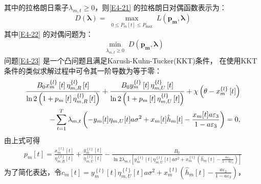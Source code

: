 其中的拉格朗日乘子$\lambda_{m,t}\geq 0$，则\eqref{E4-21} 的拉格朗日对偶函数表示为：
\begin{equation} \label{E4-22}
D(\mathbf{\lambda})=\max _{\substack{0 \leq P_m[t] \leq P_{\max }}} L\left(\mathbf{p_m},\mathbf{\lambda}\right)
\end{equation}
其中\eqref{E4-22} 的对偶问题为：
\begin{equation} \label{E4-23}
\min_{\substack{\lambda_{m,t}\geq 0}} D\left(\mathbf{p_m},\mathbf{\lambda}\right)
\end{equation}
问题\eqref{E4-23} 是一个凸问题且满足Karush-Kuhn-Tucker(KKT)条件，
在使用KKT条件的类似求解过程中可令其一阶导数为等于零：
\begin{align}\label{E4-24}
\frac{{{B}_{0}}x_{m}^{\left\{ l \right\}}\left[ t \right]\eta _{m,R}^{\left\{ l \right\}}\left[ t \right]}{\ln 2\left( 1+{{p}_{m}}\left[ t \right]\eta _{m,R}^{\left\{ l \right\}}\left[ t \right] \right)}+\frac{{{B}_{0}}y_{m}^{\left\{ l \right\}}\left[ t \right]\eta _{m,U}^{\left\{ l \right\}}\left[ t \right]}{\ln 2\left( 1+{{p}_{m}}\left[ t \right]\eta _{m,U}^{\left\{ l \right\}}\left[ t \right] \right)}+\chi \left( \theta -x_{m}^{\left\{ l \right\}}\left[ t \right] \right) \\   \notag
-\sum\limits_{t=1}^{T}{{{\lambda }_{m,t}}}\left( -{{y}_{m}}[t]{{\eta }_{m,U}}[t]a{{\sigma }^{2}}+{{x}_{m}}[t]{{{\hat{h}}}\phantom{}_{m}}[t]-\frac{{{x}_{m}}[t]a{{\varepsilon }_{3}}}{1-a{{\varepsilon }_{3}}} \right)=0,
\end{align}
由上式可得
\begin{align}\label{E4-25}
\!\!\!\!{{p}_{m}}\left[ t \right]=\frac{x_{m}^{\left\{ l \right\}}\left[ t \right]}{\eta _{m,R}^{\left\{ l \right\}}\left[ t \right]}+\frac{y_{m}^{\left\{ l \right\}}\left[ t \right]}{\eta _{m,U}^{\left\{ l \right\}}\left[ t \right]}-\frac{{{B}_{0}}}{\ln 2{{\lambda }_{m,t}}\left[ y_{m}^{\left\{ l \right\}}\left[ t \right]\eta _{m,U}^{\left\{ l \right\}}\left[ t \right]a{{\sigma }^{2}}+x_{m}^{\left\{ l \right\}}\left( {{{\hat{h}}}\phantom{}_{m}}[t]-\frac{a{{\varepsilon }_{3}}}{1-a{{\varepsilon }_{3}}} \right) \right]}
\end{align}
为了简化表达，令${{c}_{m}}\left[ t \right]=y_{m}^{\left\{ l \right\}}\left[ t \right]\eta _{m,U}^{\left\{ l \right\}}\left[ t \right]a{{\sigma }^{2}}+x_{m}^{\left\{ l \right\}}\left( {{{\hat{h}}}\phantom{}_{m}}[t]-\frac{a{{\varepsilon }_{3}}}{1-a{{\varepsilon }_{3}}} \right)$，

